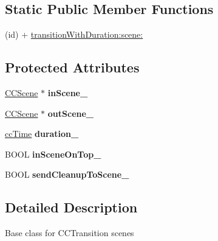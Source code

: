 \subsection*{Static Public Member Functions}
\begin{DoxyCompactItemize}
\item 
(id) + \hyperlink{interface_c_c_transition_scene_af49d7862a7560b4b4954dda1363cfa28}{transition\-With\-Duration\-:scene\-:}
\end{DoxyCompactItemize}
\subsection*{Protected Attributes}
\begin{DoxyCompactItemize}
\item 
\hypertarget{interface_c_c_transition_scene_af2124c0fbf07e6fed902443463c327cd}{\hyperlink{interface_c_c_scene}{C\-C\-Scene} $\ast$ {\bfseries in\-Scene\-\_\-}}\label{interface_c_c_transition_scene_af2124c0fbf07e6fed902443463c327cd}

\item 
\hypertarget{interface_c_c_transition_scene_a03e89787613dbfd7373145d6c8d648e9}{\hyperlink{interface_c_c_scene}{C\-C\-Scene} $\ast$ {\bfseries out\-Scene\-\_\-}}\label{interface_c_c_transition_scene_a03e89787613dbfd7373145d6c8d648e9}

\item 
\hypertarget{interface_c_c_transition_scene_a401fabf7ea77b0292a3237e1c010a9cd}{\hyperlink{cc_types_8h_ae6c674aac4bfb46a4e6cb1e89bb66b4f}{cc\-Time} {\bfseries duration\-\_\-}}\label{interface_c_c_transition_scene_a401fabf7ea77b0292a3237e1c010a9cd}

\item 
\hypertarget{interface_c_c_transition_scene_ab59c925d05c1e41353693e5c3feea823}{B\-O\-O\-L {\bfseries in\-Scene\-On\-Top\-\_\-}}\label{interface_c_c_transition_scene_ab59c925d05c1e41353693e5c3feea823}

\item 
\hypertarget{interface_c_c_transition_scene_a3cfca8789d54419c1858d8a2e3e4fea4}{B\-O\-O\-L {\bfseries send\-Cleanup\-To\-Scene\-\_\-}}\label{interface_c_c_transition_scene_a3cfca8789d54419c1858d8a2e3e4fea4}

\end{DoxyCompactItemize}


\subsection{Detailed Description}
Base class for C\-C\-Transition scenes 


